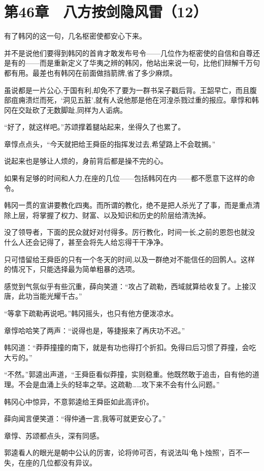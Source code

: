 \section{第46章　八方按剑隐风雷（12）}

有了韩冈的这一句，几名枢密使都安心下来。

并不是说他们要得到韩冈的首肯才敢发布号令——几位作为枢密使的自信和自尊还是有的——而是重新定义了华夷之辨的韩冈，他站出来说一句，比他们辩解千万句都有用。最差也有韩冈在前面做挡箭牌,省了多少麻烦。

虽说都是一片公心,于国有利,却免不了要为一群书呆子戳后背。王韶早亡，而且腹部疽痈溃烂而死，‘洞见五脏’,就有人说他那是他在河湟杀戮过重的报应。章惇和韩冈在交趾砍了无数脚趾,同样为人诟病。

“好了，就这样吧。”苏颂撑着腿站起来，坐得久了也累了。

章惇点点头，“今天就把给王舜臣的指挥发过去,希望路上不会耽搁。”

说起来也是够让人烦的，身前背后都是操不完的心。

如果有足够的时间和人力,在座的几位——包括韩冈在内——都不愿意下这样的命令。

韩冈一贯的宣讲要教化四夷。而所谓的教化，绝不是把人杀光了了事，而是重点清除上层，将掌握了权力、财富、以及知识和历史的阶层给清洗掉。

没了领导者，下面的民众就好对付得多。厉行教化，时间一长,之前的恩怨也就没什么人还会记得了，甚至会将先人给忘得干干净净。

只可惜留给王舜臣的只有一个冬天的时间,以及一群绝对不能信任的回鹘人。这样的情况下，只能选择最为简单粗暴的选项。

感觉到气氛似乎有些沉重，薛向笑道：“攻占了疏勒，西域就算给收复了。上接汉唐，此功当能光耀千古。”

“等拿下疏勒再说吧。”韩冈摇头，也只有他方便泼凉水。

章惇哈哈笑了两声：“说得也是，等捷报来了再庆功不迟。”

韩冈道：“莽莽撞撞的南下，就是有功也得打个折扣。免得曰后习惯了莽撞，会吃大亏的。”

“不然。”郭逵出声道，“王舜臣看似莽撞，实则稳重。他既然敢于追击，自有他的道理。不会是血涌上头的轻率之举。这疏勒……攻下来不会有什么问题。”

韩冈心中惊异，不意郭逵给王舜臣如此高评价。

薛向闻言便笑道：“得仲通一言,我等可就更安心了。”

章惇、苏颂都点头，深有同感。

郭逵看人的眼光是朝中公认的厉害，论将帅可否，有说法叫‘龟卜烛照’，百不一失，在座的几位都没有异议。

